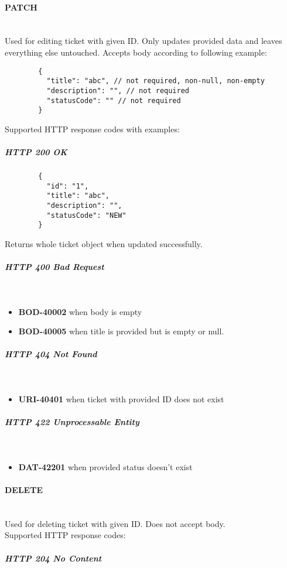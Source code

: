\documentclass[a4paper]{article}
\newcommand{\newLineParagraph}[1]{\paragraph{#1}\mbox{}\\}
\newcommand{\newLineSubParagraph}[1]{\subparagraph{#1}\mbox{}\\}
\begin{document}
    \newLineParagraph{PATCH}
    Used for editing ticket with given ID. Only updates provided data and leaves everything else untouched. Accepts body according to following example:
    \begin{verbatim}
        {
          "title": "abc", // not required, non-null, non-empty
          "description": "", // not required
          "statusCode": "" // not required
        }
    \end{verbatim}
    Supported HTTP response codes with examples:
    \subparagraph{HTTP 200 OK}
    \begin{verbatim}
        {
          "id": "1",
          "title": "abc",
          "description": "",
          "statusCode": "NEW"
        }
    \end{verbatim}
    Returns whole ticket object when updated successfully.
    \newLineSubParagraph{HTTP 400 Bad Request}
    \begin{itemize}
        \item \textbf{BOD-40002} when body is empty
        \item \textbf{BOD-40005} when title is provided but is empty or null.
    \end{itemize}
    \newLineSubParagraph{HTTP 404 Not Found}
    \begin{itemize}
        \item \textbf{URI-40401} when ticket with provided ID does not exist
    \end{itemize}
    \newLineSubParagraph{HTTP 422 Unprocessable Entity}
    \begin{itemize}
        \item \textbf{DAT-42201} when provided status doesn't exist
    \end{itemize}

    \newLineParagraph{DELETE}
    Used for deleting ticket with given ID. Does not accept body. \\
    Supported HTTP response codes:
    \subparagraph{HTTP 204 No Content}
\end{document}
